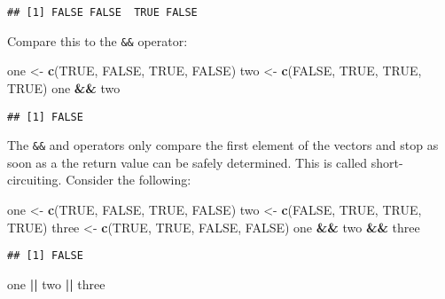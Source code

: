\documentclass[
]{article}
\newenvironment{Shaded}{\begin{snugshade}}{\end{snugshade}}
\newcommand{\KeywordTok}[1]{\textcolor[rgb]{0.13,0.29,0.53}{\textbf{#1}}}
\newcommand{\NormalTok}[1]{#1}
\newcommand{\OperatorTok}[1]{\textcolor[rgb]{0.81,0.36,0.00}{\textbf{#1}}}
\newcommand{\OtherTok}[1]{\textcolor[rgb]{0.56,0.35,0.01}{#1}}
\newcommand{\StringTok}[1]{\textcolor[rgb]{0.31,0.60,0.02}{#1}}
\begin{document}
\begin{verbatim}
## [1] FALSE FALSE  TRUE FALSE
\end{verbatim}

Compare this to the \texttt{\&\&} operator:

\begin{Shaded}
\begin{Highlighting}[]
\NormalTok{one \textless{}{-}}\StringTok{ }\KeywordTok{c}\NormalTok{(}\OtherTok{TRUE}\NormalTok{, }\OtherTok{FALSE}\NormalTok{, }\OtherTok{TRUE}\NormalTok{, }\OtherTok{FALSE}\NormalTok{)}
\NormalTok{two \textless{}{-}}\StringTok{ }\KeywordTok{c}\NormalTok{(}\OtherTok{FALSE}\NormalTok{, }\OtherTok{TRUE}\NormalTok{, }\OtherTok{TRUE}\NormalTok{, }\OtherTok{TRUE}\NormalTok{)}
\NormalTok{one }\OperatorTok{\&\&}\StringTok{ }\NormalTok{two}
\end{Highlighting}
\end{Shaded}

\begin{verbatim}
## [1] FALSE
\end{verbatim}

The \texttt{\&\&} and \texttt{\textbar{}\textbar{}} operators only compare the first element of the vectors and stop as soon as a the return
value can be safely determined. This is called short-circuiting. Consider the following:

\begin{Shaded}
\begin{Highlighting}[]
\NormalTok{one \textless{}{-}}\StringTok{ }\KeywordTok{c}\NormalTok{(}\OtherTok{TRUE}\NormalTok{, }\OtherTok{FALSE}\NormalTok{, }\OtherTok{TRUE}\NormalTok{, }\OtherTok{FALSE}\NormalTok{)}
\NormalTok{two \textless{}{-}}\StringTok{ }\KeywordTok{c}\NormalTok{(}\OtherTok{FALSE}\NormalTok{, }\OtherTok{TRUE}\NormalTok{, }\OtherTok{TRUE}\NormalTok{, }\OtherTok{TRUE}\NormalTok{)}
\NormalTok{three \textless{}{-}}\StringTok{ }\KeywordTok{c}\NormalTok{(}\OtherTok{TRUE}\NormalTok{, }\OtherTok{TRUE}\NormalTok{, }\OtherTok{FALSE}\NormalTok{, }\OtherTok{FALSE}\NormalTok{)}
\NormalTok{one }\OperatorTok{\&\&}\StringTok{ }\NormalTok{two }\OperatorTok{\&\&}\StringTok{ }\NormalTok{three}
\end{Highlighting}
\end{Shaded}

\begin{verbatim}
## [1] FALSE
\end{verbatim}

\begin{Shaded}
\begin{Highlighting}[]
\NormalTok{one }\OperatorTok{||}\StringTok{ }\NormalTok{two }\OperatorTok{||}\StringTok{ }\NormalTok{three}
\end{Highlighting}
\end{Shaded}
\end{document}
